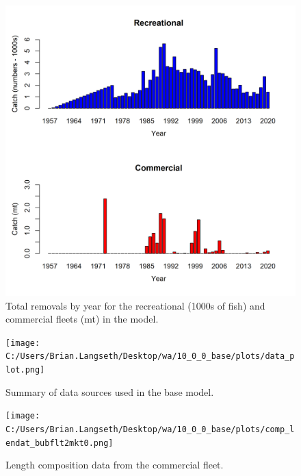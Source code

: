\documentclass[11pt,
  english,
  a4paper,
]{article}
\begin{document}
\begin{figure}
\centering
\includegraphics[width=1\textwidth,height=1\textheight]{figs/catches_wa.png}
\caption{Total removals by year for the recreational (1000s of fish) and commercial fleets (mt) in the model.\label{fig:catch}}
\end{figure}

\tagmcend\tagstructend


\begin{figure}
\centering
\texttt{[image: C:/Users/Brian.Langseth/Desktop/wa/10\_0\_0\_base/plots/data\_plot.png]}
\caption{Summary of data sources used in the base model.\label{fig:data-plot}}
\end{figure}

\tagmcend\tagstructend


\begin{figure}
\centering
\texttt{[image: C:/Users/Brian.Langseth/Desktop/wa/10\_0\_0\_base/plots/comp\_lendat\_bubflt2mkt0.png]}
\caption{Length composition data from the commercial fleet.\label{fig:com-len-data}}
\end{figure}
\end{document}
